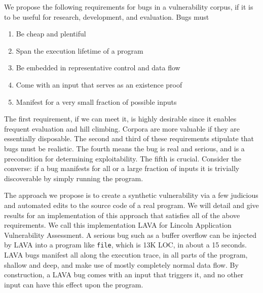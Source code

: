 We propose the following requirements for bugs in a vulnerability corpus, if it is to be useful for research, development, and evaluation.
Bugs must
\begin{enumerate}
\item Be cheap and plentiful
\item Span the execution lifetime of a program
\item Be embedded in representative control and data flow
\item Come with an input that serves as an existence proof 
\item Manifest for a very small fraction of possible inputs
\end {enumerate}
The first requirement, if we can meet it, is highly desirable since it enables frequent evaluation and hill climbing. 
Corpora are more valuable if they are essentially disposable. 
The second and third of these requirements stipulate that bugs must be realistic.
The fourth means the bug is real and serious, and is a precondition for determining exploitability. 
The fifth is crucial.
Consider the converse: if a bug manifests for all or a large fraction of inputs it is trivially discoverable by simply running the program.

The approach we propose is to create a synthetic vulnerability via a few judicious and automated edits to the source code of a real program.
We will detail and give results for an implementation of this approach that satisfies all of the above requirements.
We call this implementation LAVA for Lincoln Application Vulnerability Assessment.    
A serious bug such as a buffer overflow can be injected by LAVA into a program like \verb+file+, which is 13K LOC, in about a 15 seconds.
LAVA bugs manifest all along the execution trace, in all parts of the program, shallow and deep, and make use of mostly completely normal data flow.
By construction, a LAVA bug comes with an input that triggers it, and no other input can have this effect upon the program.
